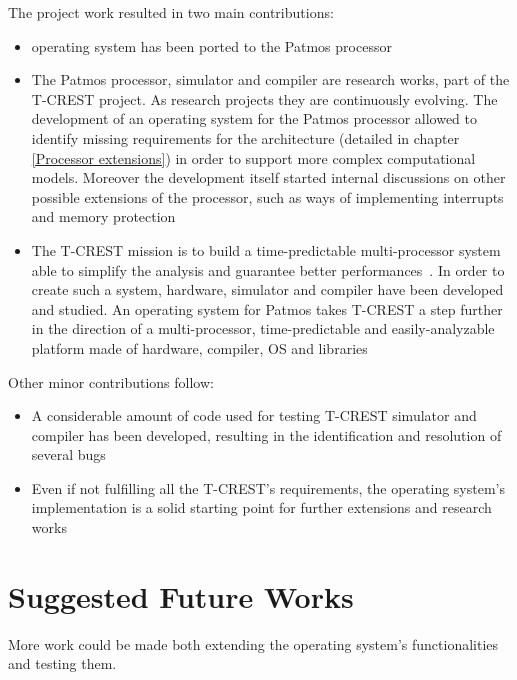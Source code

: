 The project work resulted in two main contributions:
\begin{itemize}
	\item \os operating system has been ported to the Patmos processor
	\item The Patmos processor, simulator and compiler are research works, part of the T-CREST project. As research projects they are continuously evolving. The development of an operating system for the Patmos processor allowed to identify missing requirements for the architecture (detailed in chapter \ref{Processor extensions}) in order to support more complex computational models. Moreover the development itself started internal discussions on other possible extensions of the processor, such as ways of implementing interrupts and memory protection
	\item The T-CREST mission is to build a time-predictable multi-processor system able to simplify the analysis and guarantee better performances~\cite{t-crest:d8.2}. In order to create such a system, hardware, simulator and compiler have been developed and studied. An operating system for Patmos takes T-CREST a step further in the direction of a multi-processor, time-predictable and easily-analyzable platform made of hardware, compiler, OS and libraries
\end{itemize}

Other minor contributions follow:

\begin{itemize}
	\item A considerable amount of code used for testing T-CREST simulator and compiler has been developed, resulting in the identification and resolution of several bugs
	\item Even if not fulfilling all the T-CREST's requirements, the operating system's implementation is a solid starting point for further extensions and research works
\end{itemize}

\section{Suggested Future Works}

More work could be made both extending the operating system's functionalities and testing them.

